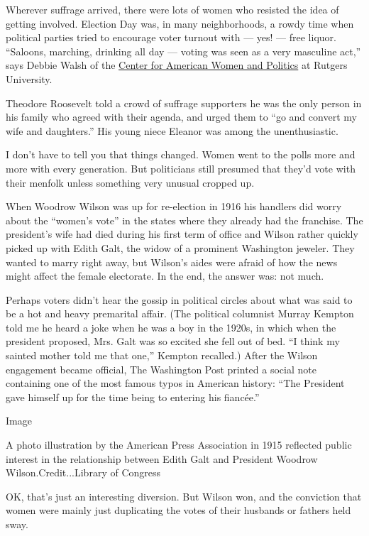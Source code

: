 Wherever suffrage arrived, there were lots of women who resisted the
idea of getting involved. Election Day was, in many neighborhoods, a
rowdy time when political parties tried to encourage voter turnout with
--- yes! --- free liquor. ``Saloons, marching, drinking all day ---
voting was seen as a very masculine act,'' says Debbie Walsh of the
\href{https://cawp.rutgers.edu/}{Center for American Women and Politics}
at Rutgers University.

Theodore Roosevelt told a crowd of suffrage supporters he was the only
person in his family who agreed with their agenda, and urged them to
``go and convert my wife and daughters.'' His young niece Eleanor was
among the unenthusiastic.

I don't have to tell you that things changed. Women went to the polls
more and more with every generation. But politicians still presumed that
they'd vote with their menfolk unless something very unusual cropped up.

When Woodrow Wilson was up for re-election in 1916 his handlers did
worry about the ``women's vote'' in the states where they already had
the franchise. The president's wife had died during his first term of
office and Wilson rather quickly picked up with Edith Galt, the widow of
a prominent Washington jeweler. They wanted to marry right away, but
Wilson's aides were afraid of how the news might affect the female
electorate. In the end, the answer was: not much.

Perhaps voters didn't hear the gossip in political circles about what
was said to be a hot and heavy premarital affair. (The political
columnist Murray Kempton told me he heard a joke when he was a boy in
the 1920s, in which when the president proposed, Mrs. Galt was so
excited she fell out of bed. ``I think my sainted mother told me that
one,'' Kempton recalled.) After the Wilson engagement became official,
The Washington Post printed a social note containing one of the most
famous typos in American history: ``The President gave himself up for
the time being to entering his fiancée.''

Image

A photo illustration by the American Press Association in 1915 reflected
public interest in the relationship between Edith Galt and President
Woodrow Wilson.Credit...Library of Congress

OK, that's just an interesting diversion. But Wilson won, and the
conviction that women were mainly just duplicating the votes of their
husbands or fathers held sway.

